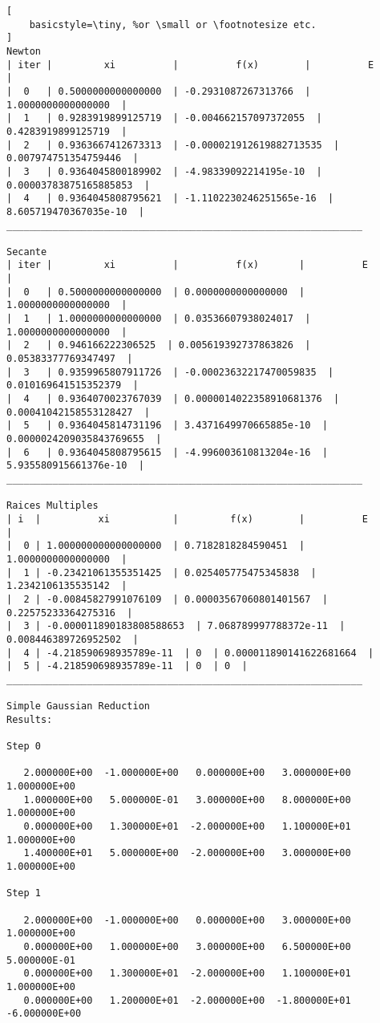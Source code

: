 \documentclass{article}
\begin{document}
\begin{lstlisting}[
    basicstyle=\tiny, %or \small or \footnotesize etc.
]
Newton
| iter |         xi          |          f(x)        |          E          |
|  0   | 0.5000000000000000  | -0.2931087267313766  | 1.0000000000000000  |
|  1   | 0.9283919899125719  | -0.004662157097372055  | 0.4283919899125719  |
|  2   | 0.9363667412673313  | -0.000021912619882713535  | 0.007974751354759446  |
|  3   | 0.9364045800189902  | -4.98339092214195e-10  | 0.00003783875165885853  |
|  4   | 0.9364045808795621  | -1.1102230246251565e-16  | 8.605719470367035e-10  |
______________________________________________________________

Secante
| iter |         xi          |          f(x)       |          E          |
|  0   | 0.5000000000000000  | 0.0000000000000000  | 1.0000000000000000  |
|  1   | 1.0000000000000000  | 0.03536607938024017  | 1.0000000000000000  |
|  2   | 0.946166222306525  | 0.005619392737863826  | 0.05383377769347497  |
|  3   | 0.9359965807911726  | -0.00023632217470059835  | 0.010169641515352379  |
|  4   | 0.9364070023767039  | 0.0000014022358910681376  | 0.00041042158553128427  |
|  5   | 0.9364045814731196  | 3.4371649970665885e-10  | 0.0000024209035843769655  |
|  6   | 0.9364045808795615  | -4.996003610813204e-16  | 5.935580915661376e-10  |
______________________________________________________________

Raices Multiples
| i  |          xi           |         f(x)        |          E          |
|  0 | 1.000000000000000000  | 0.7182818284590451  | 1.0000000000000000  |
|  1 | -0.23421061355351425  | 0.025405775475345838  | 1.2342106135535142  |
|  2 | -0.00845827991076109  | 0.00003567060801401567  | 0.22575233364275316  |
|  3 | -0.000011890183808588653  | 7.068789997788372e-11  | 0.008446389726952502  |
|  4 | -4.218590698935789e-11  | 0  | 0.000011890141622681664  |
|  5 | -4.218590698935789e-11  | 0  | 0  |
______________________________________________________________

Simple Gaussian Reduction
Results:

Step 0

   2.000000E+00  -1.000000E+00   0.000000E+00   3.000000E+00   1.000000E+00
   1.000000E+00   5.000000E-01   3.000000E+00   8.000000E+00   1.000000E+00
   0.000000E+00   1.300000E+01  -2.000000E+00   1.100000E+01   1.000000E+00
   1.400000E+01   5.000000E+00  -2.000000E+00   3.000000E+00   1.000000E+00

Step 1

   2.000000E+00  -1.000000E+00   0.000000E+00   3.000000E+00   1.000000E+00
   0.000000E+00   1.000000E+00   3.000000E+00   6.500000E+00   5.000000E-01
   0.000000E+00   1.300000E+01  -2.000000E+00   1.100000E+01   1.000000E+00
   0.000000E+00   1.200000E+01  -2.000000E+00  -1.800000E+01  -6.000000E+00


\end{lstlisting}
\end{document}
